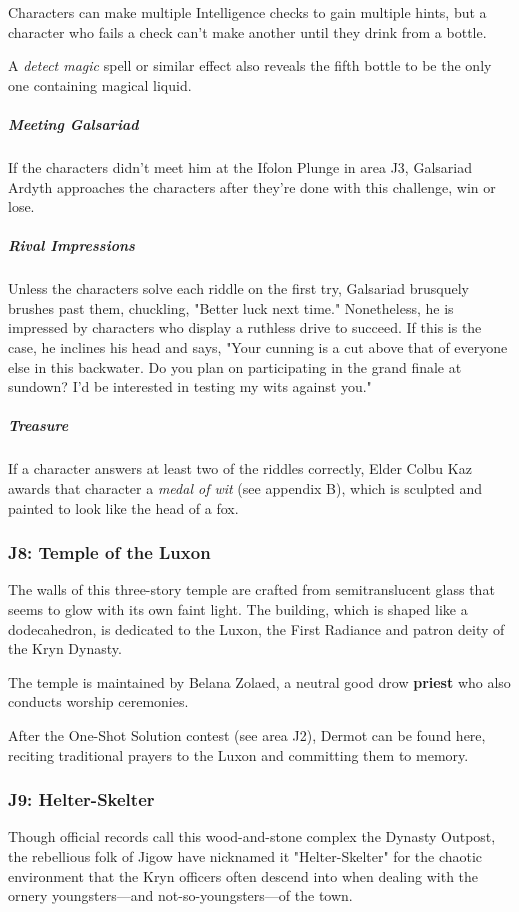 \documentclass[10pt,a4paper,twoside,bg=print,twocolumn,openany,nodeprecatedcode]{dndbook}
\begin{document}
Characters can make multiple Intelligence checks to gain multiple hints, but a character who fails a check can't make another until they drink from a bottle.

A \textit{detect magic} spell or similar effect also reveals the fifth bottle to be the only one containing magical liquid.

\subparagraph{Meeting Galsariad}
If the characters didn't meet him at the Ifolon Plunge in area J3, Galsariad Ardyth approaches the characters after they're done with this challenge, win or lose.

\subparagraph{Rival Impressions}
Unless the characters solve each riddle on the first try, Galsariad brusquely brushes past them, chuckling, "Better luck next time." Nonetheless, he is impressed by characters who display a ruthless drive to succeed. If this is the case, he inclines his head and says, "Your cunning is a cut above that of everyone else in this backwater. Do you plan on participating in the grand finale at sundown? I'd be interested in testing my wits against you."

\subparagraph{Treasure}
If a character answers at least two of the riddles correctly, Elder Colbu Kaz awards that character a \textit{medal of wit} (see appendix B), which is sculpted and painted to look like the head of a fox.

\subsubsection{J8: Temple of the Luxon}
\begin{DndReadAloud}{}
The walls of this three-story temple are crafted from semitranslucent glass that seems to glow with its own faint light. The building, which is shaped like a dodecahedron, is dedicated to the Luxon, the First Radiance and patron deity of the Kryn Dynasty.

\end{DndReadAloud}

The temple is maintained by Belana Zolaed, a neutral good drow \textbf{priest} who also conducts worship ceremonies.

After the One-Shot Solution contest (see area J2), Dermot can be found here, reciting traditional prayers to the Luxon and committing them to memory.

\subsubsection{J9: Helter-Skelter}
Though official records call this wood-and-stone complex the Dynasty Outpost, the rebellious folk of Jigow have nicknamed it "Helter-Skelter" for the chaotic environment that the Kryn officers often descend into when dealing with the ornery youngsters—and not-so-youngsters—of the town.
\end{document}
